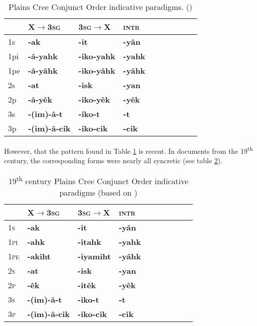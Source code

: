 \documentclass{article}
\newcommand{\ipa}[1]{{\phon\textbf{#1}}}
\newcommand{\bleu}[1]{\cellcolor{blue!30}\textbf{#1}}
\begin{document}
\begin{table}[H]
\caption{Plains Cree Conjunct Order indicative paradigms.  (\citealt{wolfart96sketch})}
\label{tab:cree.conj} \centering
\begin{tabular}{llllllllll}
  \bottomrule
  &	X$\rightarrow$\textsc{3sg} &	\textsc{3sg}$\rightarrow$X &	\textsc{intr} &	\\	
  \midrule
  1s &	\ipa{-ak} \bleu{} &	\ipa{-it} \bleu{}&	\ipa{-yân} &	\\
1pi &	\ipa{-â-yahk} &	\ipa{-iko-yahk} &	\ipa{-yahk} &	\\
1pe &	\ipa{-â-yâhk} &	\ipa{-iko-yâhk} &	\ipa{-yâhk} &	\\
2s &	\ipa{-at} \bleu{}&	\ipa{-isk} \bleu{}&	\ipa{-yan} &	\\
2p &	\ipa{-â-yêk} &	\ipa{-iko-yêk} &	\ipa{-yêk} &	\\
3s &	\ipa{-(im)-â-t} &	\ipa{-iko-t} &	\ipa{-t} &	\\
3p &	\ipa{-(im)-â-cik} &	\ipa{-iko-cik} &	\ipa{-cik} &	\\
    \bottomrule
\end{tabular}
\end{table}

However, that  the pattern found in Table   \ref{tab:cree.conj} is recent. In documents from the 19\textsuperscript{th} century, the corresponding forms were nearly all syncretic (see table \ref{tab:creedia.conj}).

\begin{table}[H]
\caption{19\textsuperscript{th} century Plains Cree Conjunct Order indicative paradigms (based on \citealt{dahlstrom89change})}
\label{tab:creedia.conj} \centering
\begin{tabular}{llllllllll}
  \bottomrule
  &	X$\rightarrow$\textsc{3sg} &	\textsc{3sg}$\rightarrow$X &	\textsc{intr} &	\\	
  \midrule
\textsc{1s} &	\ipa{-ak} &	\ipa{-it} &	\ipa{-yân} &	\\
\textsc{1pi} &	\ipa{-ahk} &	\ipa{-itahk} &	\ipa{-yahk} &	\\
\textsc{1pe} &	\ipa{-akiht} &	\ipa{-iyamiht} &	\ipa{-yâhk} &	\\
\textsc{2s} &	\ipa{-at} &	\ipa{-isk} &	\ipa{-yan} &	\\
\textsc{2p} &	\ipa{-êk} &	\ipa{-itêk} &	\ipa{-yêk} &	\\
\textsc{3s} &	\ipa{-(im)-â-t} &	\ipa{-iko-t} &	\ipa{-t} &	\\
\textsc{3p} &	\ipa{-(im)-â-cik} &	\ipa{-iko-cik} &	\ipa{-cik} &	\\
  \bottomrule
\end{tabular}
\end{table}
\end{document}

